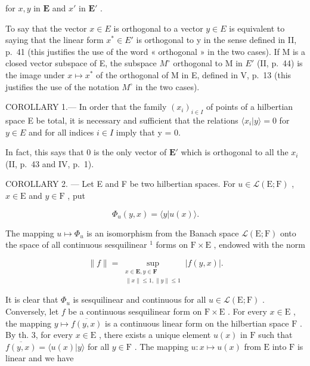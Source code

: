 for \(x, y\) in \(\mathbf{E}\) and \(x'\) in \(\mathbf{E}'\) .

To say that the vector \(x \in E\) is orthogonal to a vector \(y \in E\) is equivalent to saying that the linear form \(x^{*} \in E'\) is orthogonal to y in the sense defined in II, p.~41 (this justifies the use of the word « orthogonal » in the two cases). If M is a closed vector subspace of E, the subspace \(M^{\circ}\) orthogonal to M in \(E'\) (II, p.~44) is the image under \(x \mapsto x^{*}\) of the orthogonal of M in E, defined in V, p.~13 (this justifies the use of the notation \(M^{\circ}\) in the two cases).

COROLLARY 1.--- In order that the family \((x_{i})_{i\in I}\) of points of a hilbertian space E be total, it is necessary and sufficient that the relations \(\langle x_{i}|y\rangle = 0\) for \(y \in E\) and for all indices \(i \in I\) imply that y = 0.

In fact, this says that 0 is the only vector of \(\mathbf{E}'\) which is orthogonal to all the \(x_{i}\) (II, p.~43 and IV, p.~1).

COROLLARY 2. --- Let E and F be two hilbertian spaces. For \(u \in \mathcal{L}(\mathrm{E};\mathrm{F})\) , \(x \in \mathrm{E}\) and \(y \in \mathrm{F}\) , put

\[
\Phi_ {u} (y, x) = \langle y | u (x) \rangle .\tag{18}
\]

The mapping \(u \mapsto \Phi_u\) is an isomorphism from the Banach space \(\mathcal{L}(\mathrm{E};\mathrm{F})\) onto the space of all continuous sesquilinear \(^1\) forms on \(\mathrm{F} \times \mathrm{E}\) , endowed with the norm

\[
\| f\| = \sup_{\substack{x\in \mathbf{E},  y\in \mathbf{F}\\ \| x\| \leqslant 1, \| y\| \leqslant 1}}\left|f(y,x)\right|.\tag{19}
\]

It is clear that \(\Phi_u\) is sesquilinear and continuous for all \(u \in \mathcal{L}(\mathrm{E};\mathrm{F})\) . Conversely, let \(f\) be a continuous sesquilinear form on \(\mathrm{F} \times \mathrm{E}\) . For every \(x \in \mathrm{E}\) , the mapping \(y \mapsto \overline{f(y,x)}\) is a continuous linear form on the hilbertian space \(\mathrm{F}\) . By th. 3, for every \(x \in \mathrm{E}\) , there exists a unique element \(u(x)\) in \(\mathrm{F}\) such that \(\overline{f(y,x)} = \langle u(x)|y\rangle\) for all \(y \in \mathrm{F}\) . The mapping \(u: x \mapsto u(x)\) from \(\mathrm{E}\) into \(\mathrm{F}\) is linear and we have

